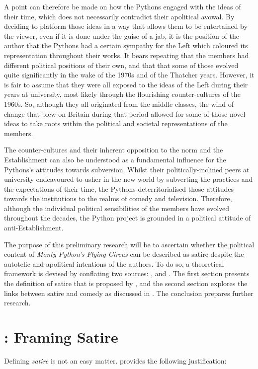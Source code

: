 \documentclass[
,a4paper
,DIV=12
,12pt
,abstract
,bibliography=totoc
]{scrartcl}
\begin{document}
A point can therefore be made on how the Pythons engaged with the ideas of their time, which does not necessarily contradict their apolitical avowal.  By deciding to platform those ideas in a way that allows them to be entertained by the viewer, even if it is done under the guise of a jab, it is the position of the author that the Pythons had a certain sympathy for the Left which coloured its representation throughout their works.  It bears repeating that the members had different political positions of their own, and that that some of those evolved quite significantly in the wake of the 1970s and of the Thatcher years.  However, it is fair to assume that they were all exposed to the ideas of the Left during their years at university, most likely through the flourishing counter-cultures of the 1960s.  So, although they all originated from the middle classes, the wind of change that blew on Britain during that period allowed for some of those novel ideas to take roots within the political and societal representations of the members.

The counter-cultures and their inherent opposition to the norm and the Establishment can also be understood as a fundamental influence for the Pythons’s attitudes towards subversion.  Whilst their politically-inclined peers at university endeavoured to usher in the new world by subverting the practices and the expectations of their time, the Pythons deterritorialised those attitudes towards the institutions to the realms of comedy and television.  Therefore, although the individual political sensibilities of the members have evolved throughout the decades, the Python project is grounded in a political attitude of anti-Establishment.

The purpose of this preliminary research will be to ascertain whether the political content of \emph{Monty Python’s Flying Circus} can be described as satire despite the autotelic and apolitical intentions of the authors.  To do so, a theoretical framework is devised by conflating two sources: \textcite{declercq2018}, and \textcite{mcgowan2017}.  The first section presents the definition of satire that is proposed by \textcite{declercq2018}, and the second section explores the links between satire and comedy as discussed in \textcite{mcgowan2017}.  The conclusion prepares further research.

\section{\textcite{declercq2018}: Framing Satire}
Defining \emph{satire} is not an easy matter.  \textcite{elliott1962} provides the following justification:
\end{document}
